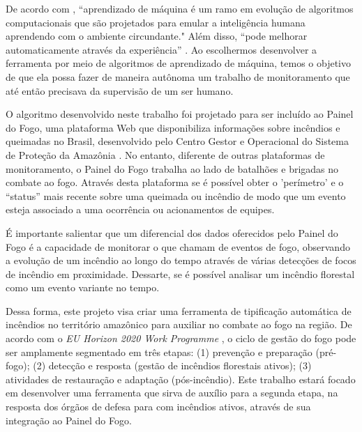 De acordo com \cite{naqa}, “aprendizado de máquina é um ramo em evolução de algoritmos computacionais que são projetados para emular a inteligência humana aprendendo com o ambiente circundante."  Além disso, “pode melhorar automaticamente através da experiência” \cite{coogan}. Ao escolhermos desenvolver a ferramenta por meio de algoritmos de aprendizado de máquina, temos o objetivo de que ela possa fazer de maneira autônoma um trabalho de monitoramento que até então precisava da supervisão de um ser humano. %

O algoritmo desenvolvido neste trabalho foi projetado para ser incluído ao Painel do Fogo, uma plataforma Web que disponibiliza informações sobre incêndios e queimadas no Brasil, desenvolvido pelo Centro Gestor e Operacional do Sistema de Proteção da Amazônia \cite{painel-fogo}. No entanto, diferente de outras plataformas de monitoramento, o Painel do Fogo trabalha ao lado de batalhões e brigadas no combate ao fogo. Através desta plataforma se é possível obter o 'perímetro' e o “status” mais recente sobre uma queimada ou incêndio de modo que um evento esteja associado a uma ocorrência ou acionamentos de equipes.

É importante salientar que um diferencial dos dados oferecidos pelo Painel do Fogo é a capacidade de monitorar o que chamam de eventos de fogo, observando a evolução de um incêndio ao longo do tempo através de várias detecções de focos de incêndio em proximidade. Dessarte, se é possível analisar um incêndio florestal como um evento variante no tempo.



Dessa forma, este projeto visa criar uma ferramenta de tipificação automática de incêndios no território amazônico para auxiliar no combate ao fogo na região. De acordo com o \textit{EU Horizon 2020 Work Programme} \cite{horizon}, o ciclo de gestão do fogo pode ser amplamente segmentado em três etapas: (1) prevenção e preparação (pré-fogo); (2) detecção e resposta (gestão de incêndios florestais ativos); (3) atividades de restauração e adaptação (pós-incêndio). Este trabalho estará focado em desenvolver uma ferramenta que sirva de auxílio para a segunda etapa, na resposta dos órgãos de defesa para com incêndios ativos, através de sua integração ao Painel do Fogo.

